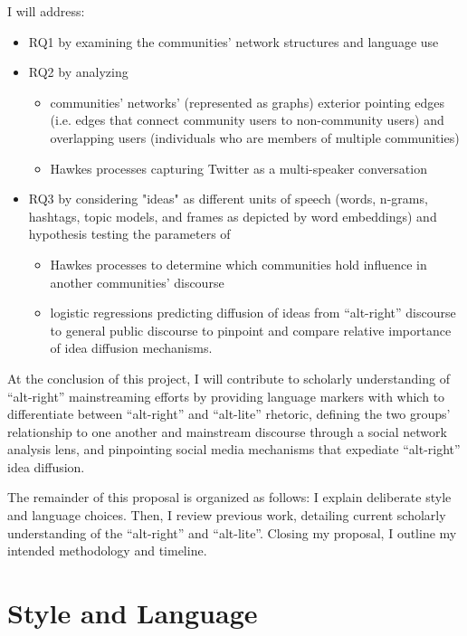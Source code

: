 \documentclass[acmlarge, screen, authorversion]{acmart}
\begin{document}
I will address:
\begin{itemize}
	\item RQ1 by examining the communities’ network structures and language use
	\item RQ2 by analyzing
	      \begin{itemize}
	      	\item communities’ networks’ (represented as graphs) exterior pointing edges
	      	      (i.e. edges that connect community users to non-community users) and
	      	      overlapping users (individuals who are members of multiple communities)
	      	\item Hawkes processes capturing Twitter as a multi-speaker
	      	      conversation
	      \end{itemize}
	\item RQ3 by considering "ideas" as different units of speech (words, n-grams, hashtags, topic models, and frames as depicted by word embeddings) and hypothesis testing the parameters of
	      \begin{itemize}
	      	\item Hawkes
	      	      processes to determine which communities hold influence in another
	      	      communities’ discourse
	      	\item logistic regressions predicting diffusion of ideas from
	      	      ``alt-right” discourse to general public discourse to pinpoint and compare relative importance of idea diffusion mechanisms.
	      \end{itemize}
\end{itemize}

At the conclusion of this project, I will contribute to scholarly understanding of ``alt-right''
mainstreaming efforts by providing language markers with which to differentiate between
``alt-right'' and ``alt-lite'' rhetoric, defining the two groups' relationship to one another and
mainstream discourse through a social network analysis lens, and pinpointing social media mechanisms
that expediate ``alt-right'' idea diffusion.

\medskip

The remainder of this proposal is organized as follows: I explain deliberate style and language
choices. Then, I review previous work, detailing current scholarly understanding of the “alt-right”
and “alt-lite”. Closing my proposal, I outline my intended methodology and timeline.

\section{Style and Language}
\end{document}
